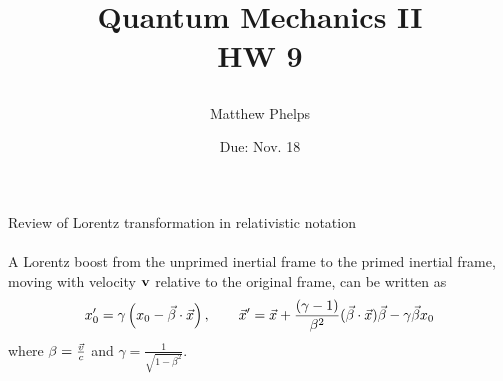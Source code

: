 \documentclass[10pt,letterpaper]{article}
\title{\begin{spacing}{1.2}Quantum Mechanics II\\HW 9\end{spacing}}
\author{Matthew Phelps}
\date{Due: Nov. 18}
\begin{document}
\maketitle

\benum
  	 \item{Review of Lorentz transformation in relativistic notation}
	\\ \\
	A Lorentz boost from the unprimed inertial frame to the primed inertial frame, moving with velocity $\mathbf{v}$
	relative to the original frame, can be written as
	\[
		x_0' = \gamma\left(x_0-\vec \beta\cdot \vec x\right),\qquad
		\vec x' = \vec x+\frac{(\gamma-1)}{\beta^2}(\vec\beta\cdot\vec x)\vec\beta-\gamma\vec\beta x_0
	\]	
	where $\mathbf{\beta} = \frac{\vec v}{c}$ and $\gamma = \frac{1}{\sqrt{1-\beta^2}}$.
	
\end{document}
